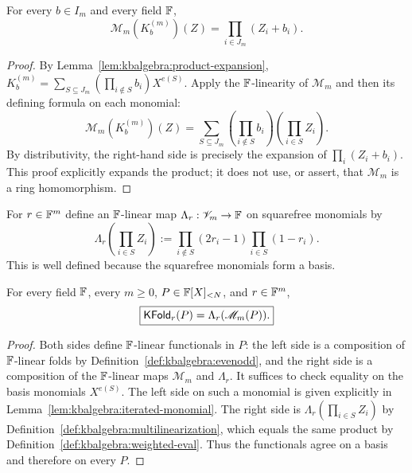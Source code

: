 \begin{lemma}\label{lem:kbalgebra:multilinear-kernel}
For every $b\in I_m$ and every field $\mathbb{F}$,
\begin{equation}\label{eq:kbalgebra:ml-kernel}
 \boxed{\mathscr M_m(K_b^{(m)})(Z)=\prod_{i\in J_m}(Z_i+b_i).}
\end{equation}
\end{lemma}
\begin{proof}
By Lemma~\ref{lem:kbalgebra:product-expansion},
$K_b^{(m)}=\sum_{S\subseteq J_m}(\prod_{i\notin S}b_i)X^{e(S)}$.
Apply the $\mathbb{F}$-linearity of $\mathscr M_m$ and then its defining formula on each monomial:
\[
 \mathscr M_m(K_b^{(m)})(Z)=\sum_{S\subseteq J_m}
 \left(\prod_{i\notin S}b_i\right)\left(\prod_{i\in S}Z_i\right).
\]
By distributivity, the right-hand side is precisely the expansion of $\prod_i(Z_i+b_i)$. This proof explicitly expands the product; it does not use, or assert, that $\mathscr M_m$ is a ring homomorphism.
\end{proof}

\begin{definition}\label{def:kbalgebra:weighted-eval}
For $r\in\mathbb{F}^m$ define an $\mathbb{F}$-linear map $\Lambda_r:\mathscr V_m\to\mathbb{F}$ on squarefree monomials by
\[
 \Lambda_r\left(\prod_{i\in S}Z_i\right):=
 \prod_{i\notin S}(2r_i-1)\prod_{i\in S}(1-r_i).
\]
This is well defined because the squarefree monomials form a basis.
\end{definition}

\begin{theorem}\label{thm:kbalgebra:tensor-fold}
For every field $\mathbb{F}$, every $m\geq0$, $P\in\mathbb{F}[X]_{<N}$, and $r\in\mathbb{F}^m$,
\begin{equation}\label{eq:kbalgebra:tensor-fold}
 \boxed{\mathsf{KFold}_r(P)=\Lambda_r(\mathscr M_m(P)).}
\end{equation}
\end{theorem}
\begin{proof}
Both sides define $\mathbb{F}$-linear functionals in $P$: the left side is a composition of $\mathbb{F}$-linear folds by Definition~\ref{def:kbalgebra:evenodd}, and the right side is a composition of the $\mathbb{F}$-linear maps $\mathscr M_m$ and $\Lambda_r$. It suffices to check equality on the basis monomials $X^{e(S)}$. The left side on such a monomial is given explicitly in Lemma~\ref{lem:kbalgebra:iterated-monomial}. The right side is $\Lambda_r(\prod_{i\in S}Z_i)$ by Definition~\ref{def:kbalgebra:multilinearization}, which equals the same product by Definition~\ref{def:kbalgebra:weighted-eval}. Thus the functionals agree on a basis and therefore on every $P$.
\end{proof}

